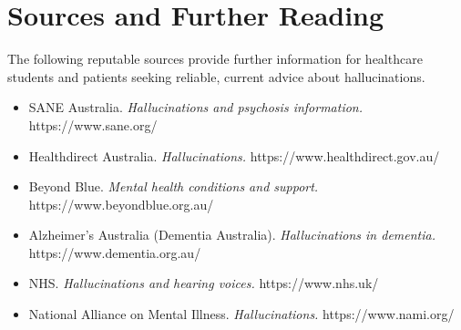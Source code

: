 \section*{Sources and Further Reading}
The following reputable sources provide further information for healthcare students and patients seeking reliable, current advice about hallucinations.

\begin{itemize}
    \item SANE Australia. \textit{Hallucinations and psychosis information.} https://www.sane.org/
    \item Healthdirect Australia. \textit{Hallucinations.} https://www.healthdirect.gov.au/
    \item Beyond Blue. \textit{Mental health conditions and support.} https://www.beyondblue.org.au/
    \item Alzheimer's Australia (Dementia Australia). \textit{Hallucinations in dementia.} https://www.dementia.org.au/
    \item NHS. \textit{Hallucinations and hearing voices.} https://www.nhs.uk/
    \item National Alliance on Mental Illness. \textit{Hallucinations.} https://www.nami.org/
\end{itemize}
